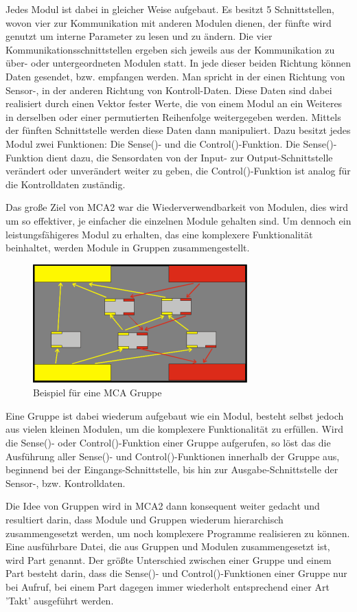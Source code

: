 Jedes Modul ist dabei in gleicher Weise aufgebaut. Es besitzt 5 Schnittstellen, wovon vier zur Kommunikation mit anderen Modulen dienen, der fünfte wird genutzt um interne Parameter zu lesen und zu ändern. Die vier Kommunikationsschnittstellen ergeben sich jeweils aus der Kommunikation zu über- oder untergeordneten Modulen statt. In jede dieser beiden Richtung können Daten gesendet, bzw. empfangen werden. Man spricht in der einen Richtung von Sensor-, in der anderen Richtung von Kontroll-Daten. Diese Daten sind dabei realisiert durch einen Vektor fester Werte, die von einem Modul an ein Weiteres in derselben oder einer permutierten Reihenfolge weitergegeben werden. Mittels der fünften Schnittstelle werden diese Daten dann manipuliert. Dazu besitzt jedes Modul zwei Funktionen: Die Sense()- und die Control()-Funktion. Die Sense()-Funktion dient dazu, die Sensordaten von der Input- zur Output-Schnittstelle verändert oder unverändert weiter zu geben, die Control()-Funktion ist analog für die Kontrolldaten zuständig.

Das große Ziel von MCA2 war die Wiederverwendbarkeit von Modulen, dies wird um so effektiver, je einfacher die einzelnen Module gehalten sind. Um dennoch ein leistungsfähigeres Modul zu erhalten, das eine komplexere Funktionalität beinhaltet, werden Module in Gruppen zusammengestellt. 

\begin{figure}[h]
	\center
	\includegraphics{graphics/mcagroup.png}
	\caption{\label{fig:MCA-Gruppe} Beispiel für eine MCA Gruppe}
\end{figure}


Eine Gruppe ist dabei wiederum aufgebaut wie ein Modul, besteht selbst jedoch aus vielen kleinen Modulen, um die komplexere Funktionalität zu erfüllen. Wird die Sense()- oder Control()-Funktion einer Gruppe aufgerufen, so löst das die Ausführung aller Sense()- und Control()-Funktionen innerhalb der Gruppe aus, beginnend bei der Eingangs-Schnittstelle, bis hin zur Ausgabe-Schnittstelle der Sensor-, bzw. Kontrolldaten.

Die Idee von Gruppen wird in MCA2 dann konsequent weiter gedacht und resultiert darin, dass Module und Gruppen wiederum hierarchisch zusammengesetzt werden, um noch komplexere Programme realisieren zu können. Eine ausführbare Datei, die aus Gruppen und Modulen zusammengesetzt ist, wird Part genannt. Der größte Unterschied zwischen einer Gruppe und einem Part besteht darin, dass die Sense()- und Control()-Funktionen einer Gruppe nur bei Aufruf, bei einem Part dagegen immer wiederholt entsprechend einer Art 'Takt' ausgeführt werden.

